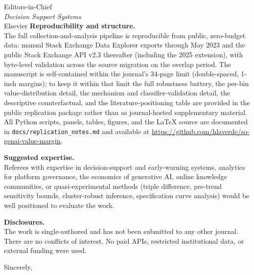 \documentclass[12pt]{letter}
\begin{document}
\begin{letter}{Editors-in-Chief \\ \emph{Decision Support Systems} \\ Elsevier}
\noindent\textbf{Reproducibility and structure.}\\
The full collection-and-analysis pipeline is reproducible
from public, zero-budget data: manual Stack Exchange Data
Explorer exports through May 2023 and the public Stack
Exchange API v2.3 thereafter (including the 2025 extension),
with byte-level validation across the source migration on the
overlap period. The manuscript is self-contained within the
journal's 34-page limit (double-spaced, 1-inch margins); to keep
it within that limit the full robustness battery, the per-bin
value-distribution detail, the mechanism and
classifier-validation detail, the descriptive counterfactual,
and the literature-positioning table are provided in the public
replication package rather than as journal-hosted supplementary
material. All Python scripts, panels, tables, figures, and the
\LaTeX{} source are documented in
\texttt{docs/replication\_notes.md} and available at
\url{https://github.com/hlaverde/so-genai-value-margin}.

\noindent\textbf{Suggested expertise.}\\
Referees with expertise in decision-support and early-warning
systems, analytics for platform governance, the economics of
generative AI, online knowledge communities, or
quasi-experimental methods (triple difference, pre-trend
sensitivity bounds, cluster-robust inference, specification
curve analysis) would be well positioned to evaluate the
work.

\noindent\textbf{Disclosures.}\\
The work is single-authored and has not been submitted to any
other journal. There are no conflicts of interest. No paid
APIs, restricted institutional data, or external funding were
used.

\closing{Sincerely,}

\end{letter}
\end{document}
